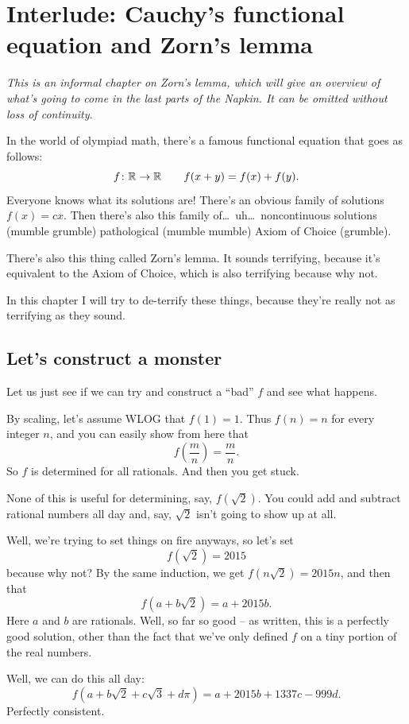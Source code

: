 \chapter{Interlude: Cauchy's functional equation and Zorn's lemma}
\label{ch:zorn}
\emph{This is an informal chapter on Zorn's lemma,
which will give an overview of what's going to come in the last parts of the Napkin.
It can be omitted without loss of continuity.}

\medskip

In the world of olympiad math, there's a famous functional equation that goes as follows:
\[ f \colon \mathbb R \to \mathbb R \qquad f(x+y) = f(x) + f(y). \]
Everyone knows what its solutions are!
There's an obvious family of solutions $f(x) = cx$.
Then there's also this family of\dots\ uh\dots\ noncontinuous solutions (mumble grumble) pathological
(mumble mumble) Axiom of Choice (grumble).

There's also this thing called Zorn's lemma. It sounds terrifying,
because it's equivalent to the Axiom of Choice, which is also terrifying because why not.

In this chapter I will try to de-terrify these things,
because they're really not as terrifying as they sound.

\section{Let's construct a monster}
Let us just see if we can try and construct a ``bad'' $f$ and see what happens.

By scaling, let's assume WLOG that $f(1) = 1$.
Thus $f(n) = n$ for every integer $n$, and you can easily show from here that
\[ f\left( \frac mn \right) = \frac mn. \]
So $f$ is determined for all rationals. And then you get stuck.

None of this is useful for determining, say, $f(\sqrt 2)$.
You could add and subtract rational numbers all day
and, say, $\sqrt 2$ isn't going to show up at all.

Well, we're trying to set things on fire anyways, so let's set
\[ f(\sqrt 2) = 2015 \]
because why not?
By the same induction, we get $f(n\sqrt2) = 2015n$, and then that
\[ f\left( a + b \sqrt 2 \right) = a + 2015b. \]
Here $a$ and $b$ are rationals.
Well, so far so good -- as written, this is a perfectly good solution,
other than the fact that we've only defined $f$ on a tiny portion of the real numbers.

Well, we can do this all day:
\[ f\left( a + b \sqrt 2 + c \sqrt 3 + d \pi \right) = a + 2015b + 1337c - 999d. \]
Perfectly consistent.

